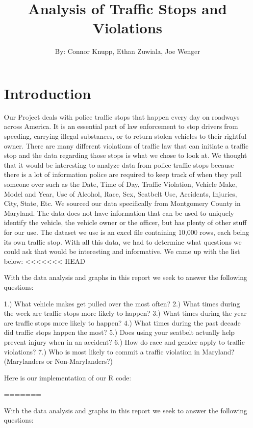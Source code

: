 \documentclass[
  letterpaper,
  DIV=11,
  numbers=noendperiod]{scrartcl}
\title{Analysis of Traffic Stops and Violations}
\author{By: Connor Knupp, Ethan Zuwiala, Joe Wenger}
\date{}
\begin{document}
\maketitle


\section{Introduction}\label{introduction}

Our Project deals with police traffic stops that happen every day on
roadways across America. It is an essential part of law enforcement to
stop drivers from speeding, carrying illegal substances, or to return
stolen vehicles to their rightful owner. There are many different
violations of traffic law that can initiate a traffic stop and the data
regarding those stops is what we chose to look at. We thought that it
would be interesting to analyze data from police traffic stops because
there is a lot of information police are required to keep track of when
they pull someone over such as the Date, Time of Day, Traffic Violation,
Vehicle Make, Model and Year, Use of Alcohol, Race, Sex, Seatbelt Use,
Accidents, Injuries, City, State, Etc. We sourced our data specifically
from Montgomery County in Maryland. The data does not have information
that can be used to uniquely identify the vehicle, the vehicle owner or
the officer, but has plenty of other stuff for our use. The dataset we
use is an excel file containing 10,000 rows, each being its own traffic
stop. With all this data, we had to determine what questions we could
ask that would be interesting and informative. We came up with the list
below: \textless\textless\textless\textless\textless\textless\textless{}
HEAD

With the data analysis and graphs in this report we seek to answer the
following questions:

1.) What vehicle makes get pulled over the most often? 2.) What times
during the week are traffic stops more likely to happen? 3.) What times
during the year are traffic stops more likely to happen? 4.) What times
during the past decade did traffic stops happen the most? 5.) Does using
your seatbelt actually help prevent injury when in an accident? 6.) How
do race and gender apply to traffic violations? 7.) Who is most likely
to commit a traffic violation in Maryland? (Marylanders or
Non-Marylanders?)

Here is our implementation of our R code:

=======

With the data analysis and graphs in this report we seek to answer the
following questions:
\end{document}
